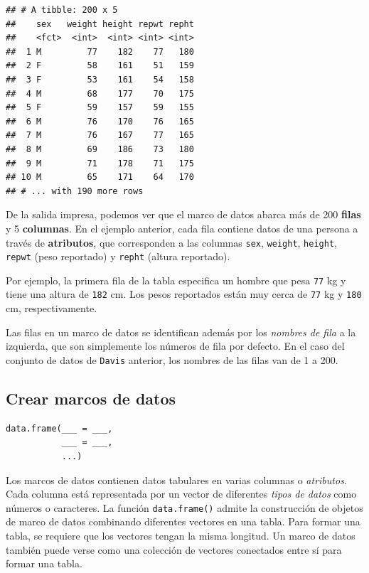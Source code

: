 \documentclass[
]{book}
\begin{document}
\begin{verbatim}
## # A tibble: 200 x 5
##    sex   weight height repwt repht
##    <fct>  <int>  <int> <int> <int>
##  1 M         77    182    77   180
##  2 F         58    161    51   159
##  3 F         53    161    54   158
##  4 M         68    177    70   175
##  5 F         59    157    59   155
##  6 M         76    170    76   165
##  7 M         76    167    77   165
##  8 M         69    186    73   180
##  9 M         71    178    71   175
## 10 M         65    171    64   170
## # ... with 190 more rows
\end{verbatim}

De la salida impresa, podemos ver que el marco de datos abarca más de 200 \textbf{filas} y 5 \textbf{columnas}. En el ejemplo anterior, cada fila contiene datos de una persona a través de \textbf{atributos}, que corresponden a las columnas \texttt{sex}, \texttt{weight}, \texttt{height}, \texttt{repwt} (peso reportado) y \texttt{repht} (altura reportado).

Por ejemplo, la primera fila de la tabla especifica un hombre que pesa \texttt{77} kg y tiene una altura de \texttt{182} cm. Los pesos reportados están muy cerca de \texttt{77} kg y \texttt{180} cm, respectivamente.

Las filas en un marco de datos se identifican además por los \emph{nombres de fila} a la izquierda, que son simplemente los números de fila por defecto. En el caso del conjunto de datos de \texttt{Davis} anterior, los nombres de las filas van de 1 a 200.

\hypertarget{crear-marcos-de-datos}{%
\subsection{Crear marcos de datos}\label{crear-marcos-de-datos}}

\begin{verbatim}
data.frame(___ = ___, 
           ___ = ___, 
           ...)
\end{verbatim}

Los marcos de datos contienen datos tabulares en varias columnas o \emph{atributos}. Cada columna está representada por un vector de diferentes \emph{tipos de datos} como números o caracteres. La función \texttt{data.frame()} admite la construcción de objetos de marco de datos combinando diferentes vectores en una tabla. Para formar una tabla, se requiere que los vectores tengan la misma longitud. Un marco de datos también puede verse como una colección de vectores conectados entre sí para formar una tabla.
\end{document}
